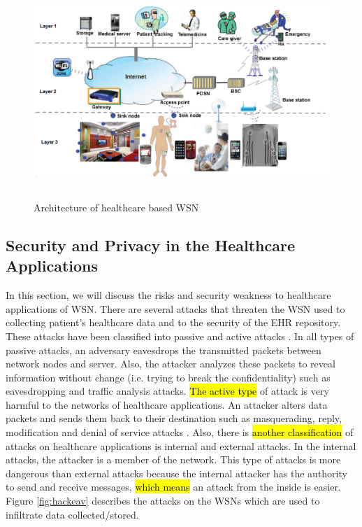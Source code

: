 \documentclass[a4paper,11pt]{article}
\DeclareRobustCommand{\hlyellow}[1]{{\sethlcolor{white}\hl{#1}}}
\begin{document}
\begin{figure}[t]
	\centering
		\includegraphics[width=15cm,height=8cm]{pic/archwsn2.png}
	\caption{Architecture of healthcare based WSN \cite{pr6}}
	\label{fig:archwsn2}
\end{figure}

\subsection{Security and Privacy in the Healthcare Applications}
In this section, we will discuss the risks and security weakness to healthcare applications of WSN. There are several attacks that threaten the WSN used to collecting patient's healthcare data and to the security of the EHR repository. These attacks have been classified into passive and active attacks \cite{pr8}. In all types of passive attacks, an adversary eavesdrops the transmitted packets between network nodes and server. Also, the attacker analyzes these packets to reveal information without change (i.e. trying to break the confidentiality) such as eavesdropping and traffic analysis attacks. \hlyellow{The active type} of attack is very harmful to the networks of healthcare applications. An attacker alters data packets and sends them back to their destination such as masquerading, reply, modification and denial of service attacks \cite{pr19}. Also, there is \hlyellow{another classification} of attacks on healthcare applications is internal and external attacks. In the internal attacks, the attacker is a member of the network. This type of attacks is more dangerous than external attacks because the internal attacker has the authority to send and receive messages, \hlyellow{which means} an attack from the inside is easier. Figure \ref {fig:hackeav} describes the attacks on the WSNs which are used to infiltrate data collected/stored.
\end{document}
